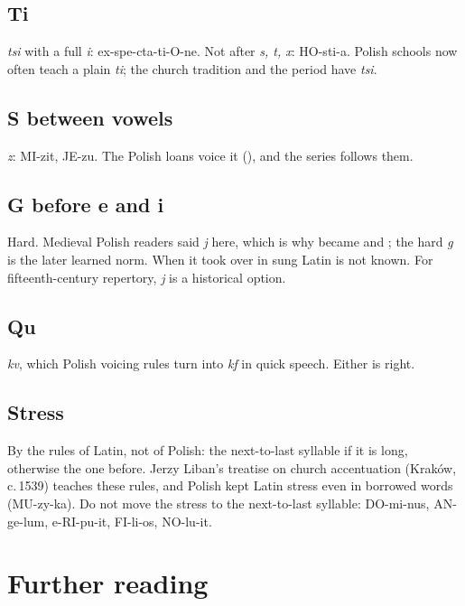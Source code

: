 \documentclass[guide]{pol-ren}
\begin{document}
\subsection{Ti} \textit{tsi} with a full \textit{i}: ex-spe-cta-ti-O-ne. Not
after \textit{s, t, x}: HO-sti-a. Polish schools now often teach a plain
\textit{ti}; the church tradition and the period have \textit{tsi}.

\subsection{S between vowels} \textit{z}: MI-zit, JE-zu. The Polish loans
voice it (), and the series follows them.

\subsection{G before e and i} Hard. Medieval Polish readers said \textit{j}
here, which is why  became  and 
; the hard \textit{g} is the later learned norm. When it took
over in sung Latin is not known. For fifteenth-century repertory, \textit{j}
is a historical option.

\subsection{Qu} \textit{kv}, which Polish voicing rules turn into \textit{kf}
in quick speech. Either is right.

\subsection{Stress} By the rules of Latin, not of Polish: the next-to-last
syllable if it is long, otherwise the one before. Jerzy Liban’s treatise on
church accentuation (Kraków, c.\,1539) teaches these rules, and Polish kept
Latin stress even in borrowed words (MU-zy-ka). Do not move the stress to the
next-to-last syllable: DO-mi-nus, AN-ge-lum, e-RI-pu-it, FI-li-os, NO-lu-it.

\section*{Further reading}
\end{document}
